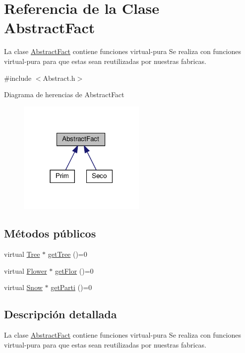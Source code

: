 \hypertarget{classAbstractFact}{}\section{Referencia de la Clase Abstract\+Fact}
\label{classAbstractFact}


La clase \hyperlink{classAbstractFact}{Abstract\+Fact} contiene funciones virtual-\/pura  Se realiza con funciones virtual-\/pura para que estas sean reutilizadas por nuestras fabricas.  




{\ttfamily \#include $<$Abstract.\+h$>$}



Diagrama de herencias de Abstract\+Fact\nopagebreak
\begin{figure}[H]
\begin{center}
\leavevmode
\includegraphics[width=174pt]{classAbstractFact__inherit__graph}
\end{center}
\end{figure}
\subsection*{Métodos públicos}
\begin{DoxyCompactItemize}
\item 
virtual \hyperlink{classTree}{Tree} $\ast$ \hyperlink{classAbstractFact_a37e763c0a454db79c61f229d33b72c73}{get\+Tree} ()=0
\item 
virtual \hyperlink{classFlower}{Flower} $\ast$ \hyperlink{classAbstractFact_a9ee9f34bc189886b24e325ff2412a1d9}{get\+Flor} ()=0
\item 
virtual \hyperlink{classSnow}{Snow} $\ast$ \hyperlink{classAbstractFact_a7b642a7fe5615f7103dd7d1ab4c801d9}{get\+Parti} ()=0
\end{DoxyCompactItemize}


\subsection{Descripción detallada}
La clase \hyperlink{classAbstractFact}{Abstract\+Fact} contiene funciones virtual-\/pura  Se realiza con funciones virtual-\/pura para que estas sean reutilizadas por nuestras fabricas. 


